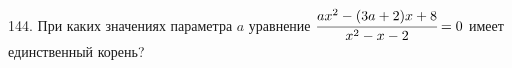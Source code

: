 144. При каких значениях параметра $a$ уравнение $\cfrac{ax^2-(3a+2)x+8}{x^2-x-2}=0$ имеет единственный корень?\\
